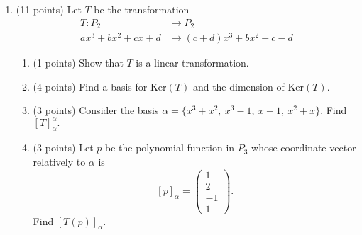 \documentclass[11pt]{article}
\begin{document}
\begin{enumerate}
\item (11 points) Let $T$ be the transformation
\begin{align*}
T:P_2 &\longrightarrow P_2\\
ax^3+bx^2+cx+d &\longrightarrow (c+d)x^3+bx^2 -c-d
\end{align*}
\begin{enumerate}
\item (1 points) Show that $T$ is a linear transformation.
\item (4 points) Find a basis for $\text{Ker}(T)$ and the dimension of  $\text{Ker}(T)$.
\item (3 points) Consider the basis $\alpha = \lbrace x^3+x^2, \ x^3-1, \ x+1, \ x^2+x  \rbrace$. Find $[T]^{\alpha}_{\alpha}.$
\item (3 points) Let $p$ be the polynomial function in $P_3$ whose coordinate vector relatively to $\alpha$ is 
\[ [p]_{\alpha}=\begin{pmatrix} 1\\ 2\\ -1\\ 1 \end{pmatrix}.\]
Find $[T(p)]_{\alpha}.$
\end{enumerate}

\begin{comment}
\underline{Solution:}


\end{comment}
\end{enumerate}
\end{document}
